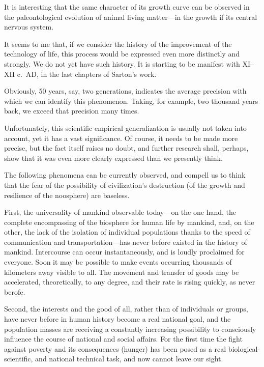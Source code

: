 It is interesting that the same character of its growth curve can be observed
in the paleontological evolution of animal living matter---in the growth if its
central nervous system.

It seems to me that, if we consider the history of the improvement of the
technology of life, this process would be expressed even more distinctly and
strongly.  We do not yet have such history.  It is starting to be manifest with
XI--XII c.\ AD, in the last chapters of Sarton's work.

Obviously, 50 years, say, two generations, indicates the average precision with
which we can identify this phenomenon.  Taking, for example, two thousand years
back, we exceed that precision many times.

Unfortunately, this scientific empirical generalization is usually not taken
into account, yet it has a vast significance.  Of course, it needs to be made
more precise, but the fact itself raises no doubt, and further research shall,
perhaps, show that it was even more clearly expressed than we presently think.


\Section %
The following phenomena can be currently observed, and compell us to think that
the fear of the possibility of civilization's destruction (of the growth and
resilience of the noosphere) are baseless.

First, the universality of mankind observable today---on the one hand, the complete encompassing of
the biosphere for human life by mankind, and, on the other, the lack of the
isolation of individual populations thanks
to the speed of communication and transportation---has never before existed in
the history of mankind.  Intercourse can occur instantaneously, and is loudly
proclaimed for everyone.  Soon it may be possible to make events occurring
thousands of kilometers away visible to all.  The movement and transfer of
goods may be accelerated, theoretically, to any degree, and their rate is
rising quickly, as never berofe.

Second, the interests and the good of all, rather than of individuals or
groups, have never before in human history become a real national goal, and the
population masses are receiving a constantly increasing possibility to
consciously influence the course of national and social affairs.  For the first
time the fight against poverty and its consequences (hunger) has been posed as
a real biological-scientific, and national technical task, and now cannot leave
our sight.

